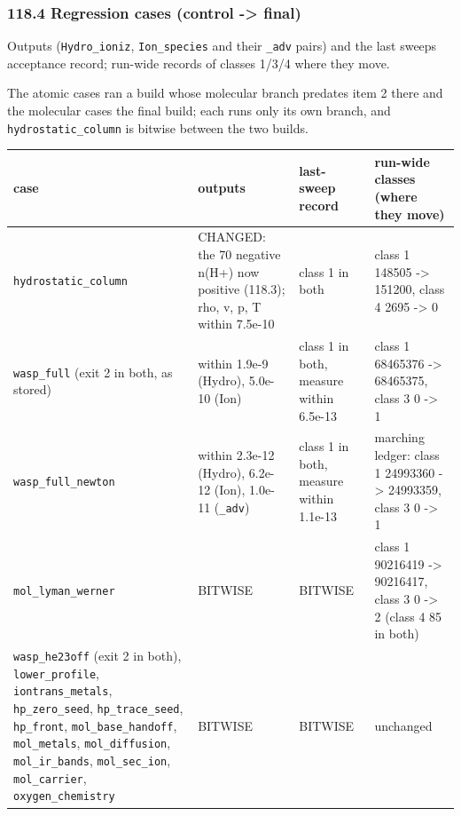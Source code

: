 \documentclass[english,a4paper]{my_memo}
\begin{document}
\subsubsection{118.4 Regression cases (control -\textgreater{} final)}\label{1184-regression-cases-control---final}

Outputs (\texttt{Hydro\_ioniz}, \texttt{Ion\_species} and their \texttt{\_adv} pairs) and the last
sweep\textquotesingle s acceptance record; run-wide records of classes 1/3/4 where they move.

The atomic cases ran a build whose molecular branch predates item 2 there and
the molecular cases the final build; each runs only its own branch, and
\texttt{hydrostatic\_column} is bitwise between the two builds.

{\def\LTcaptype{none} %
{\small
\begin{longtable}[]{@{}>{\raggedright\arraybackslash}p{\dimexpr(\linewidth-8\tabcolsep)/4\relax}>{\raggedright\arraybackslash}p{\dimexpr(\linewidth-8\tabcolsep)/4\relax}>{\raggedright\arraybackslash}p{\dimexpr(\linewidth-8\tabcolsep)/4\relax}>{\raggedright\arraybackslash}p{\dimexpr(\linewidth-8\tabcolsep)/4\relax}@{}}
\toprule\noalign{}
case & outputs & last-sweep record & run-wide classes (where they move) \\
\midrule\noalign{}
\endhead
\bottomrule\noalign{}
\endlastfoot
\texttt{hydrostatic\_column} & CHANGED: the 70 negative n(H+) now positive (118.3); rho, v, p, T within 7.5e-10 & 504 class 1 in both & class 1 148505 -\textgreater{} 151200, class 4 2695 -\textgreater{} 0 \\
\texttt{wasp\_full} (exit 2 in both, as stored) & within 1.9e-9 (Hydro), 5.0e-10 (Ion) & 504 class 1 in both, measure within 6.5e-13 & class 1 68465376 -\textgreater{} 68465375, class 3 0 -\textgreater{} 1 \\
\texttt{wasp\_full\_newton} & within 2.3e-12 (Hydro), 6.2e-12 (Ion), 1.0e-11 (\texttt{\_adv}) & 504 class 1 in both, measure within 1.1e-13 & marching ledger: class 1 24993360 -\textgreater{} 24993359, class 3 0 -\textgreater{} 1 \\
\texttt{mol\_lyman\_werner} & BITWISE & BITWISE & class 1 90216419 -\textgreater{} 90216417, class 3 0 -\textgreater{} 2 (class 4 85 in both) \\
\texttt{wasp\_he23off} (exit 2 in both), \texttt{lower\_profile}, \texttt{iontrans\_metals}, \texttt{hp\_zero\_seed}, \texttt{hp\_trace\_seed}, \texttt{hp\_front}, \texttt{mol\_base\_handoff}, \texttt{mol\_metals}, \texttt{mol\_diffusion}, \texttt{mol\_ir\_bands}, \texttt{mol\_sec\_ion}, \texttt{mol\_carrier}, \texttt{oxygen\_chemistry} & BITWISE & BITWISE & unchanged \\
\end{longtable}
}
}
\end{document}
